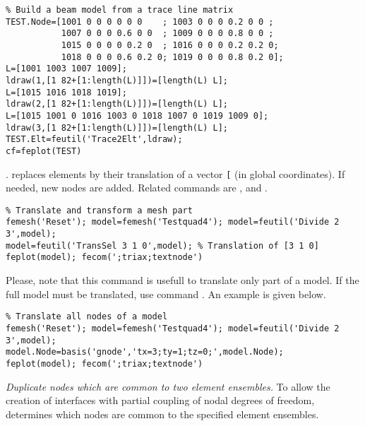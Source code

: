 \begin{verbatim}
% Build a beam model from a trace line matrix
TEST.Node=[1001 0 0 0 0 0 0    ; 1003 0 0 0 0.2 0 0 ;
           1007 0 0 0 0.6 0 0  ; 1009 0 0 0 0.8 0 0 ;
           1015 0 0 0 0 0.2 0  ; 1016 0 0 0 0.2 0.2 0;
           1018 0 0 0 0.6 0.2 0; 1019 0 0 0 0.8 0.2 0]; 
L=[1001 1003 1007 1009];  
ldraw(1,[1 82+[1:length(L)]])=[length(L) L]; 
L=[1015 1016 1018 1019];
ldraw(2,[1 82+[1:length(L)]])=[length(L) L]; 
L=[1015 1001 0 1016 1003 0 1018 1007 0 1019 1009 0];
ldraw(3,[1 82+[1:length(L)]])=[length(L) L];
TEST.Elt=feutil('Trace2Elt',ldraw);
cf=feplot(TEST)
\end{verbatim}%


.   replaces elements by their translation of a vector {\tt [}\tsi{tx ty tz}{\tt ]} (in global coordinates).  If needed, new nodes are added.  Related commands are ,  and .

\begin{verbatim}
% Translate and transform a mesh part
femesh('Reset'); model=femesh('Testquad4'); model=feutil('Divide 2 3',model); 
model=feutil('TransSel 3 1 0',model); % Translation of [3 1 0]
feplot(model); fecom(';triax;textnode')
\end{verbatim}%

Please, note that this command is usefull to translate only part of a model. If the full model must be translated, use \basis command . An example is given below.

\begin{verbatim}
% Translate all nodes of a model
femesh('Reset'); model=femesh('Testquad4'); model=feutil('Divide 2 3',model); 
model.Node=basis('gnode','tx=3;ty=1;tz=0;',model.Node);
feplot(model); fecom(';triax;textnode')
\end{verbatim}%



{\sl Duplicate nodes which are common to two element ensembles.} To allow the creation of interfaces with partial coupling of nodal degrees of freedom,  determines which nodes are common to the specified element ensembles. 

